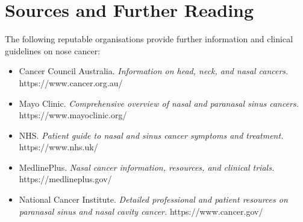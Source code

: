 \section*{Sources and Further Reading}
The following reputable organisations provide further information and clinical guidelines on nose cancer:
\begin{itemize}
    \item Cancer Council Australia. \textit{Information on head, neck, and nasal cancers.} https://www.cancer.org.au/
    \item Mayo Clinic. \textit{Comprehensive overview of nasal and paranasal sinus cancers.} https://www.mayoclinic.org/
    \item NHS. \textit{Patient guide to nasal and sinus cancer symptoms and treatment.} https://www.nhs.uk/
    \item MedlinePlus. \textit{Nasal cancer information, resources, and clinical trials.} https://medlineplus.gov/
    \item National Cancer Institute. \textit{Detailed professional and patient resources on paranasal sinus and nasal cavity cancer.} https://www.cancer.gov/
\end{itemize}
